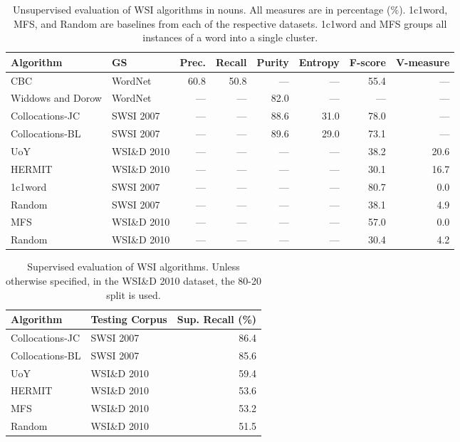 \begin{table}
\caption[Unsupervised evaluation of \acl*{WSI} algorithms]
{Unsupervised evaluation of \ac{WSI} algorithms in nouns. All measures are in
percentage ($\%$). 1c1word, \ac{MFS}, and Random are baselines from each of the
respective datasets. 1c1word and \ac{MFS} groups all instances of a word into a
single cluster.}
\label{tab:uswsi}

\begin{tabu} to \textwidth { Xlrrrrrr }
\hline
\textbf{Algorithm} & \textbf{GS} & \textbf{Prec.} & \textbf{Recall} & \textbf{Purity} & \textbf{Entropy} & \textbf{F-score} & \textbf{V-measure} \\
\hline
CBC               & WordNet        & 60.8 & 50.8 & ---  & ---  & 55.4 & ---  \\
Widdows and Dorow & WordNet        & ---  & ---  & 82.0 & ---  & ---  & ---  \\
Collocations-JC   & \ac{SWSI} 2007 & ---  & ---  & 88.6 & 31.0 & 78.0 & ---  \\
Collocations-BL   & \ac{SWSI} 2007 & ---  & ---  & 89.6 & 29.0 & 73.1 & ---  \\
UoY     & WSI\&D 2010    & ---  & ---  & ---  & ---  & 38.2 & 20.6 \\
HERMIT  & WSI\&D 2010    & ---  & ---  & ---  & ---  & 30.1 & 16.7 \\
\hline
1c1word & \ac{SWSI} 2007 & ---  & ---  & ---  & ---  & 80.7 & 
0.0\footnotemark[1] \\
Random  & \ac{SWSI} 2007 & ---  & ---  & ---  & ---  & 38.1 & 
4.9\footnotemark[1] \\
MFS     & WSI\&D 2010    & ---  & ---  & ---  & ---  & 57.0 & 0.0  \\
Random  & WSI\&D 2010    & ---  & ---  & ---  & ---  & 30.4 & 4.2  \\
\hline
\end{tabu}
\end{table}


\begin{table}
\caption[Supervised evaluation of \acl*{WSI} algorithms]
{Supervised evaluation of \ac{WSI} algorithms. Unless otherwise specified, in
the WSI\&D 2010 dataset, the 80-20 split is used.}
\label{tab:wsi}

\begin{tabu} to \textwidth { XXr }
\hline
\textbf{Algorithm} & \textbf{Testing Corpus} & \textbf{Sup. Recall} (\%)\\
\hline
Collocations-JC           & \ac{SWSI} 2007 & 86.4 \\
Collocations-BL           & \ac{SWSI} 2007 & 85.6 \\
UoY            & WSI\&D 2010    & 59.4 \\
HERMIT           & WSI\&D 2010    & 53.6 \\
\hline
MFS           & WSI\&D 2010    & 53.2 \\
Random        & WSI\&D 2010    & 51.5 \\
\hline
\end{tabu}
\end{table}

